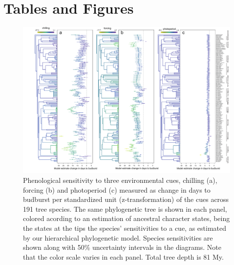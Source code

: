 \documentclass[11pt]{article}
\begin{document}




\clearpage
\section*{Tables and Figures} 


\begin{figure} 
  \begin{center}
  \includegraphics[width=16cm]{../../analyses/phylogeny/figures/Fig1_phylo_muplots191_clades.pdf}
  \caption{Phenological sensitivity to three environmental cues, chilling (a), forcing (b) and photoperiod (c) measured as change in days to budburst per standardized unit (z-transformation) of the cues across 191 tree species. The same phylogenetic tree is shown in each panel, colored acording to an estimation of ancestral character states, being the states at the tips the species' sensitivities to a cue, as estimated by our hierarchical phylogenetic model. Species sensitivities are shown along with 50\% uncertainty intervals in the diagrams. Note that the color scale varies in each panel. Total tree depth is 81 My.}
  \label{fig:muplot_all}
  \end{center}
\end{figure}

\clearpage
\end{document}
